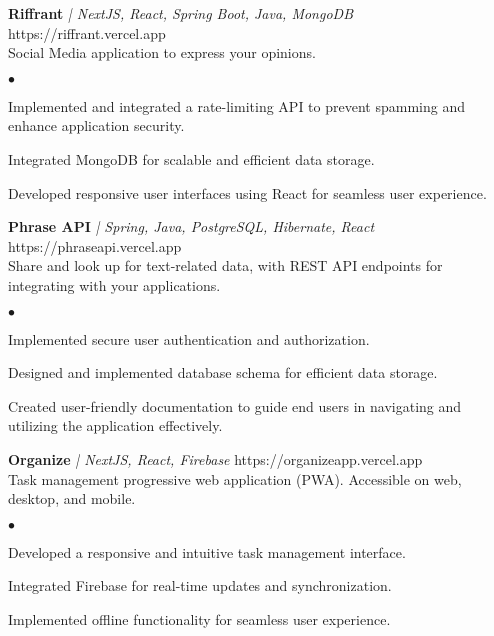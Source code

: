 \documentclass[a4paper]{article}
\newenvironment{achievements}{
        \begin{list}
            {$\bullet$}{\topsep 0pt \itemsep -2pt}}{\vspace*{4pt}
        \end{list}
    }
\begin{document}
        {\textbf{Riffrant}} {\sl | NextJS, React, Spring Boot, Java, MongoDB} \hfill https://riffrant.vercel.app\\
    \vspace{1mm}
    Social Media application to express your opinions.\\
    \begin{achievements}
       \item Implemented and integrated a rate-limiting API to prevent spamming and enhance application security.
        \item Integrated MongoDB for scalable and efficient data storage.
        \item Developed responsive user interfaces using React for seamless user experience.
    \end{achievements}
    \vspace*{3mm}

    {\textbf{Phrase API}} {\sl | Spring, Java, PostgreSQL, Hibernate, React} \hfill https://phraseapi.vercel.app\\
    \vspace{1mm}
    Share and look up for text-related data, with REST API endpoints for integrating with your applications.\\
    \begin{achievements}
        \item Implemented secure user authentication and authorization.
        \item Designed and implemented database schema for efficient data storage.
        \item Created user-friendly documentation to guide end users in navigating and utilizing the application effectively.
    \end{achievements}
    \vspace*{3mm}

    {\textbf{Organize}} {\sl | NextJS, React, Firebase} \hfill https://organizeapp.vercel.app\\
    \vspace{1mm}
    Task management progressive web application (PWA). Accessible on web, desktop, and mobile.\\
    \begin{achievements}
        \item Developed a responsive and intuitive task management interface.
        \item Integrated Firebase for real-time updates and synchronization.
        \item Implemented offline functionality for seamless user experience.
    \end{achievements}
\end{document}
